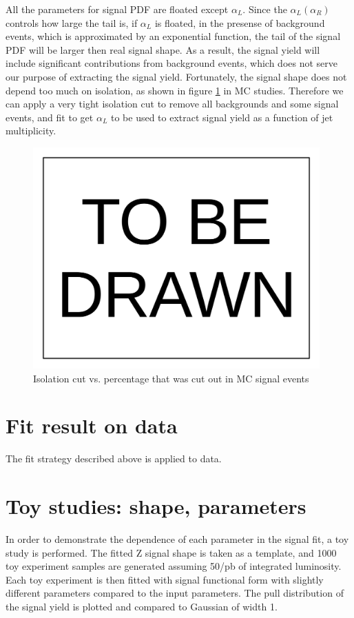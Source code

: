 \documentclass[10pt,a4paper,onecolumn]{article}
\begin{document}
All the parameters for signal PDF are floated except $\alpha_L$.  Since the $\alpha_L (\alpha_R)$ controls how large the tail is, if $\alpha_L$ is floated,
in the presense of background events, which is approximated by an exponential function, the tail of the signal PDF will be larger then real signal shape.
As a result, the signal yield will include significant contributions from background events, which does not serve our purpose of extracting the signal yield.
Fortunately, the signal shape does not depend too much on isolation, as shown in figure \ref{Figure_SignalShapeVsIsolation} in MC studies.
Therefore we can apply a very tight isolation cut to remove all backgrounds and some signal events, and fit to get $\alpha_L$ to be used to extract signal yield
as a function of jet multiplicity.

\begin{figure}
\includegraphics[width=110mm]{ToBeDrawn.pdf}
\caption{Isolation cut vs. percentage that was cut out in MC signal events}
\label{Figure_SignalShapeVsIsolation}
\end{figure}

\section{Fit result on data}

The fit strategy described above is applied to data.


\section{Toy studies: shape, parameters}

In order to demonstrate the dependence of each parameter in the signal fit, a toy study is performed.
The fitted Z signal shape is taken as a template, and 1000 toy experiment samples are generated assuming 50/pb of integrated luminosity.
Each toy experiment is then fitted with signal functional form with slightly different parameters compared to the input parameters.
The pull distribution of the signal yield is plotted and compared to Gaussian of width 1.
\end{document}

